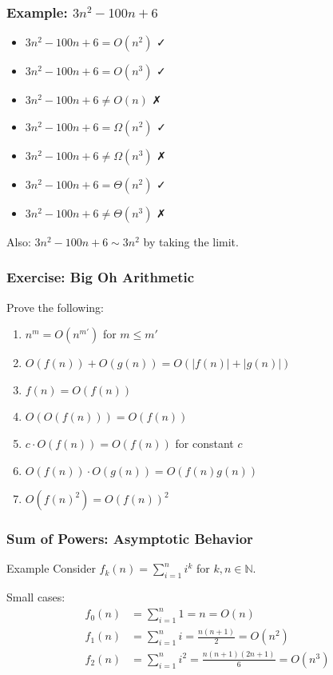 \documentclass{beamer}
\begin{document}
\begin{frame}
  \frametitle{Example: $3n^2 - 100n + 6$}
  
  \begin{itemize}
    \item $3n^2 - 100n + 6 = O(n^2)$ ✓
    \item $3n^2 - 100n + 6 = O(n^3)$ ✓
    \item $3n^2 - 100n + 6 \neq O(n)$ ✗
    \item $3n^2 - 100n + 6 = \Omega(n^2)$ ✓
    \item $3n^2 - 100n + 6 \neq \Omega(n^3)$ ✗
    \item $3n^2 - 100n + 6 = \Theta(n^2)$ ✓
    \item $3n^2 - 100n + 6 \neq \Theta(n^3)$ ✗
  \end{itemize}
  
  \vspace{0.3cm}
  
  Also: $3n^2 - 100n + 6 \sim 3n^2$ by taking the limit.
\end{frame}

\begin{frame}
  \frametitle{Exercise: Big Oh Arithmetic}
  
  Prove the following:
  \begin{enumerate}
    \item $n^m = O(n^{m'})$ for $m \leq m'$
    \item $O(f(n)) + O(g(n)) = O(|f(n)| + |g(n)|)$
    \item $f(n) = O(f(n))$
    \item $O(O(f(n))) = O(f(n))$
    \item $c \cdot O(f(n)) = O(f(n))$ for constant $c$
    \item $O(f(n)) \cdot O(g(n)) = O(f(n)g(n))$
    \item $O(f(n)^2) = O(f(n))^2$
  \end{enumerate}
\end{frame}

\begin{frame}
  \frametitle{Sum of Powers: Asymptotic Behavior}
  
  \begin{exampleblock}{Example}
    Consider $f_k(n) = \sum_{i=1}^n i^k$ for $k, n \in \mathbb{N}$.
    
    Small cases:
    \begin{align*}
      f_0(n) &= \sum_{i=1}^n 1 = n = O(n) \\
      f_1(n) &= \sum_{i=1}^n i = \frac{n(n+1)}{2} = O(n^2) \\
      f_2(n) &= \sum_{i=1}^n i^2 = \frac{n(n+1)(2n+1)}{6} = O(n^3)
    \end{align*}
  \end{exampleblock}
\end{frame}
\end{document}
